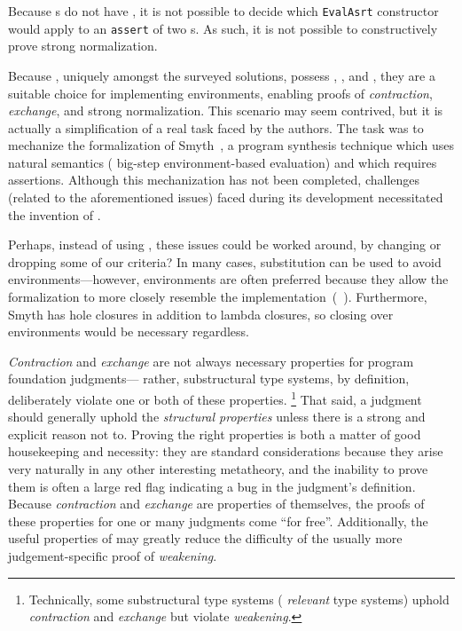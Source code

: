 Because \fpf{}s do not have \EqDec, it is not possible to decide which \texttt{EvalAsrt} constructor would
apply to an \texttt{assert} of two \fpf{}s. As such, it is not possible to constructively prove strong normalization.

Because \dds, uniquely amongst the surveyed solutions, possess \SemTot, \SemInj, and \EqDec,
they are a suitable choice for implementing environments, enabling proofs of \emph{contraction},
\emph{exchange}, and strong normalization.
This scenario may seem contrived, but it is actually a simplification of a real task faced by the authors.
The task was to mechanize the formalization of Smyth~\citep{smyth}, a program synthesis technique which uses
natural semantics (\ie{} big-step environment-based evaluation) and which requires assertions.
Although this mechanization has not been completed, challenges (related to the aforementioned issues)
faced during its development necessitated the invention of \dds.

Perhaps, instead of using \dds, these issues could be worked around, by changing or dropping some of our criteria?
In many cases, substitution can be used to avoid environments---however, environments are often preferred because
they allow the formalization to more closely resemble the implementation~(\eg{}~\citep{Ancona:2014}). Furthermore,
Smyth has hole closures in addition to lambda closures, so closing over environments would be necessary regardless.

\emph{Contraction} and \emph{exchange} are not always necessary properties for program foundation judgments---%
rather, substructural type systems, by definition, deliberately violate one or both of these properties.%
\footnote{\hspace{0.01in}Technically, some substructural type systems (\eg{} \emph{relevant} type systems) uphold \emph{contraction} and \emph{exchange} but violate \emph{weakening}.}
That said, a judgment should generally uphold the \emph{structural properties} unless there is a strong and explicit
reason not to. Proving the right properties
is both a matter of good housekeeping and necessity: they are standard
considerations because they arise very naturally in any other
interesting metatheory, and the inability to prove them is often a large red flag indicating a bug in the judgment's definition.
Because \emph{contraction} and \emph{exchange} are properties of \dds{} themselves,
the proofs of these properties for one or many judgments come ``for free''.
Additionally, the useful properties of \dds{} may greatly reduce the difficulty of the usually
more judgement-specific proof of \emph{weakening}.

